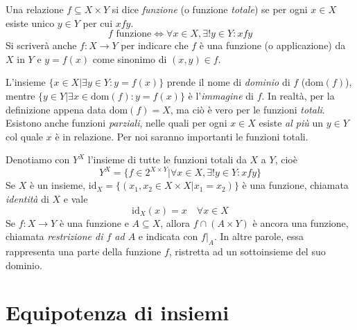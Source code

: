 \documentclass[oneside]{book}
\begin{document}
\begin{tcolorbox}[colback=yellow!30, colframe=yellow!30!black, title={Funzione}]
Una relazione $f\subseteq X\times Y$ si dice \textit{funzione} (o funzione
\textit{totale}) se per ogni $x\in X$ esiste unico $y\in Y$ per cui $xfy$.
\[ f \text{ funzione} \Longleftrightarrow \forall x\in X,\exists!y\in Y:xfy \]
Si scriverà anche $f:X\to Y$ per indicare che $f$ è una funzione (o applicazione)
da $X$ in $Y$ e $y=f(x)$ come sinonimo di $(x,y)\in f$.
\end{tcolorbox}

L'insieme $\{x\in X|\exists y\in Y: y=f(x)\}$ prende il nome di \textit{dominio}
di $f$ ($\text{dom}(f)$), mentre $\{y\in Y|\exists x\in\text{dom}(f):y=f(x)\}$
è l'\textit{immagine} di $f$. In realtà, per la definizione appena data
$\text{dom}(f)=X$, ma ciò è vero per le funzioni \textit{totali}. Esistono
anche funzioni \textit{parziali}, nelle quali per ogni $x\in X$ esiste \textit{al più}
un $y\in Y$ col quale $x$ è in relazione. Per noi saranno importanti le funzioni
totali.

Denotiamo con $Y^X$ l'insieme di tutte le funzioni totali da $X$ a $Y$, cioè
\[ Y^X = \{f\in2^{X\times Y}| \forall x\in X, \exists!y\in Y: xfy\} \]
Se $X$ è un insieme, $\text{id}_X = \{(x_1,x_2\in X\times X| x_1=x_2)\}$ è
una funzione, chiamata \textit{identità} di $X$ e vale \[ \text{id}_X(x)=x \quad \forall x\in X\]
Se $f:X\to Y$ è una funzione e $A\subseteq X$, allora $f\cap(A\times Y)$
è ancora una funzione, chiamata \textit{restrizione di $f$ ad $A$} e indicata
con $f|_A$. In altre parole, essa rappresenta una parte della funzione $f$,
ristretta ad un sottoinsieme del suo dominio.

\begin{tcolorbox}[colback=yellow!30, colframe=yellow!30!black, title={Composizione}]
\end{tcolorbox}
\begin{tcolorbox}[colback=yellow!30, colframe=yellow!30!black, title={Iniettività, surgettività, bigettività}]
\end{tcolorbox}




\section{Equipotenza di insiemi}






\end{document}
